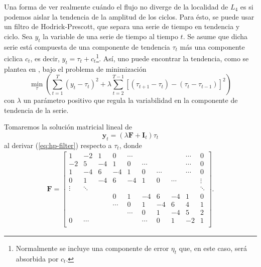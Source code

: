 Una forma de ver realmente cuándo el flujo no diverge de la localidad de $L_4$ es si podemos aislar la tendencia de la amplitud de los ciclos. Para ésto, se puede usar un filtro de Hodrick-Prescott, que separa una serie de tiempo en tendencia y ciclo. Sea $y_t$ la variable de una serie de tiempo al tiempo $t$. Se asume que dicha serie está compuesta de una componente de tendencia $\tau_t$ más una componente ciclica $c_t$, es decir, $y_t = \tau_t + c_t$\footnote{Normalmente se incluye una componente de error $\eta_t$ que, en este caso, será absorbida por $c_t$.}. Así, uno puede encontrar la tendencia, como se plantea en \cite{Hodrick1997}, bajo el problema de minimización
\begin{equation}
 \min_{\tau} \left( \sum_{t=1}^T (y_t - \tau_t)^2 + \lambda \sum_{t=2}^{T-1} \left[ (\tau_{t+1} - \tau_t) - (\tau_t - \tau_{t-1}) \right]^2 \right)
 \label{eq:hp-filter}
\end{equation} 
con $\lambda$ un parámetro positivo que regula la variabilidad en la componente de tendencia de la serie.

Tomaremos la solución matricial lineal de \cite{Kim2004}  
\begin{equation}
 \mathbf{y}_t = \left( \lambda \mathbf{F} + \mathbf{I}_t \right) \tau_t
 \label{eq:hp_matrix}
\end{equation}  
al derivar (\ref{eq:hp-filter}) respecto a $\tau_t$, donde
\begin{align}
 \mathbf{F} = \left[ \begin{array}{cccccccccc}
 1  & -2 & 1  & 0  & \cdots &        &        & & \cdots & 0    \\
 -2 & 5  & -4 & 1  & 0      & \cdots &        & & \cdots & 0    \\
 1  & -4 & 6  & -4 & 1      & 0      & \cdots & & \cdots & 0    \\
 0  & 1  & -4 & 6  & -4 & 1 & 0      & \cdots &        & \vdots \\
 \vdots  & \ddots  &  &  &  &  &  &  &        & \ddots          \\
    &    &    &  0 &  1 &-4 &    6   & -4     &      1 & 0      \\
   &   &  & \cdots &  0 & 1 &   -4   &  6     &      4 & 1      \\
   &   &  &  &   \cdots & 0 &    1   &  -4    &      5 & 2      \\
 0 &\cdots&  &  &  & \cdots &    0   &   1    &     -2 & 1      \\
 \end{array} \right].
\end{align}

